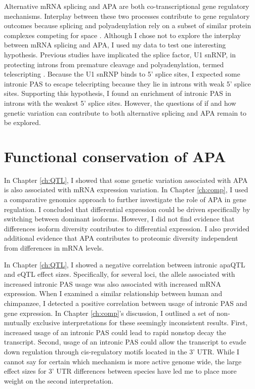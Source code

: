 Alternative mRNA splicing and APA are both co-transcriptional gene regulatory mechanisms. Interplay between these two processes contribute to gene regulatory outcomes because splicing and polyadenylation rely on a subset of similar protein complexes competing for space \citep{proudfoot_integrating_2002}. Although I chose not to explore the interplay between mRNA splicing and APA, I used my data to test one interesting hypothesis. Previous studies have implicated the splice factor, U1 snRNP, in protecting introns from premature cleavage and polyadenylation, termed telescripting \citep{kaida_u1_2010, berg_u1_2012, oh_u1_2017}.  Because the U1 snRNP binds to 5' splice sites, I expected some intronic PAS to escape telecripting because they lie in introns with weak 5' splice sites. Supporting this hypothesis, I found an enrichment of intronic PAS in introns with the weakest 5' splice sites. However, the questions of if and how genetic variation can contribute to both alternative splicing and APA remain to be explored.



\section{Functional conservation of APA }

In Chapter \ref{ch:QTL}, I showed that some genetic variation associated with APA is also associated with mRNA expression variation. In Chapter \ref{ch:comp}, I used a comparative genomics approach to further investigate the role of APA in gene regulation. I concluded that differential expression could be driven specifically by switching between dominant isoforms. However, I did not find evidence that differences isoform diversity contributes to differential expression. I also provided additional evidence that APA contributes to proteomic diversity independent from differences in mRNA levels. 

In Chapter \ref{ch:QTL}, I showed a negative correlation between intronic apaQTL and eQTL effect sizes. Specifically, for several loci, the allele associated with increased intronic PAS usage was also associated with increased mRNA expression. When I examined a similar relationship between human and chimpanzee, I detected a positive correlation between usage of intronic PAS and gene expression. In Chapter \ref{ch:comp}'s discussion, I outlined a set of non-mutually exclusive interpretations for these seemingly inconsistent results. First, increased usage of an intronic PAS could lead to rapid nonstop decay the transcript. Second, usage of an intronic PAS could allow the transcript to evade down regulation through cis-regulatory motifs located in the 3' UTR. While I cannot say for certain which mechanism is more active genome wide, the large effect sizes for 3' UTR differences between species have led me to place more weight on the second interpretation.  


